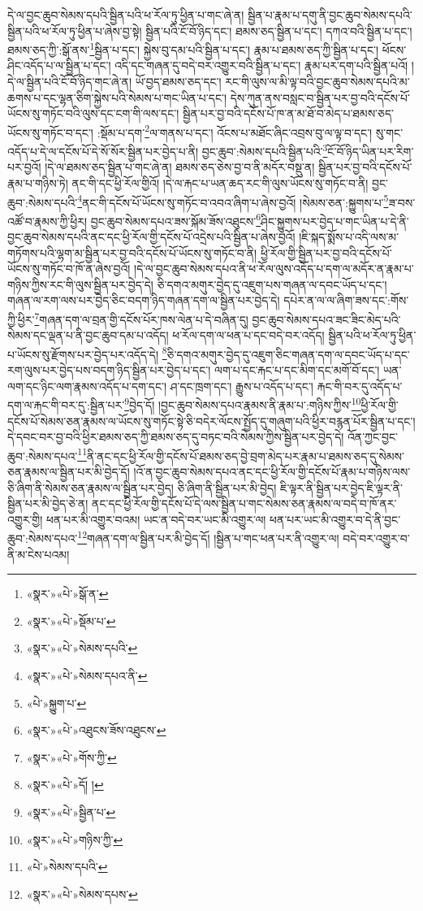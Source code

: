 དེ་ལ་བྱང་ཆུབ་སེམས་དཔའི་སྦྱིན་པའི་ཕ་རོལ་ཏུ་ཕྱིན་པ་གང་ཞེ་ན། སྦྱིན་པ་རྣམ་པ་དགུ་ནི་བྱང་ཆུབ་སེམས་དཔའི་སྦྱིན་པའི་ཕ་རོལ་ཏུ་ཕྱིན་པ་ཞེས་བྱ་སྟེ། སྦྱིན་པའི་ངོ་བོ་ཉིད་དང་། ཐམས་ཅད་སྦྱིན་པ་དང་། དཀའ་བའི་སྦྱིན་པ་དང་། ཐམས་ཅད་ཀྱི་:སྒོ་ནས་\footnote{«སྣར་»«པེ་»སྒོ་ན་}སྦྱིན་པ་དང་། སྐྱེས་བུ་དམ་པའི་སྦྱིན་པ་དང་། རྣམ་པ་ཐམས་ཅད་ཀྱི་སྦྱིན་པ་དང་། ཕོངས་ཤིང་འདོད་པ་ལ་སྦྱིན་པ་དང་། འདི་དང་གཞན་དུ་བདེ་བར་འགྱུར་བའི་སྦྱིན་པ་དང་། རྣམ་པར་དག་པའི་སྦྱིན་པའོ། །དེ་ལ་སྦྱིན་པའི་ངོ་བོ་ཉིད་གང་ཞེ་ན། ཡོ་བྱད་ཐམས་ཅད་དང་། རང་གི་ལུས་ལ་མི་ལྟ་བའི་བྱང་ཆུབ་སེམས་དཔའི་མ་ཆགས་པ་དང་ལྷན་ཅིག་སྐྱེས་པའི་སེམས་པ་གང་ཡིན་པ་དང་། དེས་ཀུན་ནས་བསླང་བ་སྦྱིན་པར་བྱ་བའི་དངོས་པོ་ཡོངས་སུ་གཏོང་བའི་ལུས་དང་ངག་གི་ལས་དང་། སྦྱིན་པར་བྱ་བའི་དངོས་པོ་ཁ་ན་མ་ཐོ་བ་མེད་པ་ཐམས་ཅད་ཡོངས་སུ་གཏོང་བ་དང་། :སྡོམ་པ་དག་\footnote{«སྣར་»«པེ་»སྡོམ་པ་}ལ་གནས་པ་དང་། འོངས་པ་མཐོང་ཞིང་འབྲས་བུ་ལ་ལྟ་བ་དང་། སུ་གང་འདོད་པ་དེ་ལ་དངོས་པོ་དེ་སོ་སོར་སྦྱིན་པར་བྱེད་པ་ནི། བྱང་ཆུབ་:སེམས་དཔའི་སྦྱིན་པའི་\footnote{«སྣར་»«པེ་»སེམས་དཔའི་}ངོ་བོ་ཉིད་ཡིན་པར་རིག་པར་བྱའོ། །དེ་ལ་ཐམས་ཅད་སྦྱིན་པ་གང་ཞེ་ན། ཐམས་ཅད་ཅེས་བྱ་བ་ནི་མདོར་བསྡུ་ན། སྦྱིན་པར་བྱ་བའི་དངོས་པོ་རྣམ་པ་གཉིས་ཏེ། ནང་གི་དང་ཕྱི་རོལ་གྱིའོ། །དེ་ལ་རྐང་པ་ཡན་ཆད་རང་གི་ལུས་ཡོངས་སུ་གཏོང་བ་ནི། བྱང་ཆུབ་:སེམས་དཔའི་\footnote{«སྣར་»«པེ་»སེམས་དཔའ་ནི་}ནང་གི་དངོས་པོ་ཡོངས་སུ་གཏོང་བ་འབའ་ཞིག་པ་ཞེས་བྱའོ། །སེམས་ཅན་:སྐྱུགས་པ་\footnote{«པེ་»སྐྱུག་པ་}ཟ་བས་འཚོ་བ་རྣམས་ཀྱི་ཕྱིར། བྱང་ཆུབ་སེམས་དཔའ་ཟས་སྐོམ་ཟོས་འཐུངས་\footnote{«སྣར་»«པེ་»འཐུངས་ཟོས་འཐུངས་}ཤིང་སྐྱུགས་པར་བྱེད་པ་གང་ཡིན་པ་དེ་ནི་བྱང་ཆུབ་སེམས་དཔའི་ནང་དང་ཕྱི་རོལ་གྱི་དངོས་པོ་འདྲེས་པའི་སྦྱིན་པ་ཞེས་བྱའོ། །ཇི་སྐད་སྨོས་པ་འདི་ལས་མ་གཏོགས་པའི་ལྷག་མ་སྦྱིན་པར་བྱ་བའི་དངོས་པོ་ཡོངས་སུ་གཏོང་བ་ནི། ཕྱི་རོལ་གྱི་སྦྱིན་པར་བྱ་བའི་དངོས་པོ་ཡོངས་སུ་གཏོང་བ་ཁོ་ན་ཞེས་བྱའོ། །དེ་ལ་བྱང་ཆུབ་སེམས་དཔའ་ནི་ཕ་རོལ་ལུས་འདོད་པ་དག་ལ་མདོར་ན་རྣམ་པ་གཉིས་ཀྱིས་རང་གི་ལུས་སྦྱིན་པར་བྱེད་དེ། ཅི་དགའ་མགུར་བྱེད་དུ་འཇུག་པས་གཞན་ལ་དབང་ཡོད་པ་དང་། གཞན་ལ་རག་ལས་པར་བྱེད་ཅིང་བདག་ཉིད་གཞན་དག་ལ་སྦྱིན་པར་བྱེད་དེ། དཔེར་ན་ལ་ལ་ཞིག་ཟས་དང་:གོས་ཀྱི་ཕྱིར་\footnote{«སྣར་»«པེ་»གོས་ཀྱི་}གཞན་དག་ལ་བྲན་གྱི་དངོས་པོར་ཁས་ལེན་པ་དེ་བཞིན་དུ། བྱང་ཆུབ་སེམས་དཔའ་ཟང་ཟིང་མེད་པའི་སེམས་དང་ལྡན་པ་ནི་བྱང་ཆུབ་དམ་པ་འདོད། ཕ་རོལ་དག་ལ་ཕན་པ་དང་བདེ་བར་འདོད། སྦྱིན་པའི་ཕ་རོལ་ཏུ་ཕྱིན་པ་ཡོངས་སུ་རྫོགས་པར་བྱེད་པར་འདོད་དེ། \footnote{«སྣར་»«པེ་»དོ། ། }ཅི་དགའ་མགུར་བྱེད་དུ་འཇུག་ཅིང་གཞན་དག་ལ་དབང་ཡོད་པ་དང་རག་ལུས་པར་བྱེད་པས་བདག་ཉིད་སྦྱིན་པར་བྱེད་པ་དང་། ལག་པ་དང་རྐང་པ་དང་མིག་དང་མགོ་བོ་དང་། ཡན་ལག་དང་ཉིང་ལག་རྣམས་འདོད་པ་དག་དང་། ཤ་དང་ཁྲག་དང་། རྒྱུས་པ་འདོད་པ་དང་། རྐང་གི་བར་དུ་འདོད་པ་དག་ལ་རྐང་གི་བར་དུ་:སྦྱིན་པར་\footnote{«སྣར་»«པེ་»སྦྱིན་པ་}བྱེད་དོ། །བྱང་ཆུབ་སེམས་དཔའ་རྣམས་ནི་རྣམ་པ་:གཉིས་ཀྱིས་\footnote{«སྣར་»«པེ་»གཉིས་ཀྱི་}ཕྱི་རོལ་གྱི་དངོས་པོ་སེམས་ཅན་རྣམས་ལ་ཡོངས་སུ་གཏོང་སྟེ་ཅི་བདེར་ལོངས་སྤྱོད་དུ་གཞུག་པའི་ཕྱིར་བརྙན་པོར་སྦྱིན་པ་དང་། དེ་དབང་བར་བྱ་བའི་ཕྱིར་ཐམས་ཅད་ཀྱི་ཐམས་ཅད་དུ་བཏང་བའི་སེམས་ཀྱིས་སྦྱིན་པར་བྱེད་དེ། འོན་ཀྱང་བྱང་ཆུབ་:སེམས་དཔའ་\footnote{«པེ་»སེམས་དཔའི་}ནི་ནང་དང་ཕྱི་རོལ་གྱི་དངོས་པོ་ཐམས་ཅད་བྱེ་བྲག་མེད་པར་རྣམ་པ་ཐམས་ཅད་དུ་སེམས་ཅན་རྣམས་ལ་སྦྱིན་པར་མི་བྱེད་དོ། །འོ་ན་བྱང་ཆུབ་སེམས་དཔའ་ནང་དང་ཕྱི་རོལ་གྱི་དངོས་པོ་རྣམ་པ་གཉིས་ལས་ཅི་ཞིག་ནི་སེམས་ཅན་རྣམས་ལ་སྦྱིན་པར་བྱེད། ཅི་ཞིག་ནི་སྦྱིན་པར་མི་བྱེད། ཇི་ལྟར་ནི་སྦྱིན་པར་བྱེད་ཇི་ལྟར་ནི་སྦྱིན་པར་མི་བྱེད་ཅེ་ན། ནང་དང་ཕྱི་རོལ་གྱི་དངོས་པོ་དེ་ལས་སྦྱིན་པ་གང་སེམས་ཅན་རྣམས་ལ་བདེ་བ་ཁོ་ནར་འགྱུར་གྱི། ཕན་པར་མི་འགྱུར་བའམ། ཡང་ན་བདེ་བར་ཡང་མི་འགྱུར་ལ། ཕན་པར་ཡང་མི་འགྱུར་བ་དེ་ནི་བྱང་ཆུབ་:སེམས་དཔའ་\footnote{«སྣར་»«པེ་»སེམས་དཔས་}གཞན་དག་ལ་སྦྱིན་པར་མི་བྱེད་དོ། །སྦྱིན་པ་གང་ཕན་པར་ནི་འགྱུར་ལ། བདེ་བར་འགྱུར་བ་ནི་མ་ངེས་པའམ། 